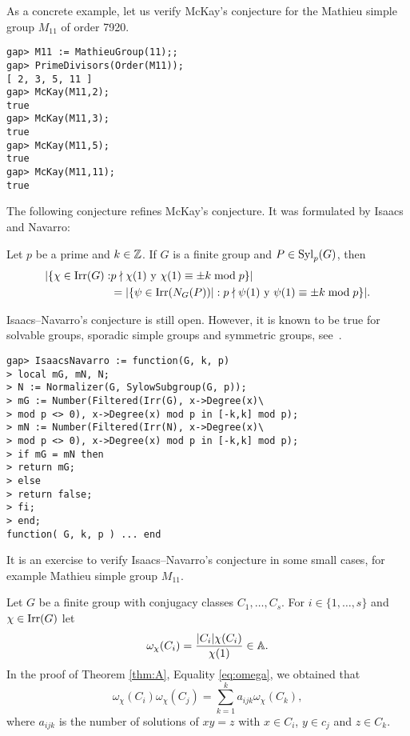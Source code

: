 As a concrete example, let us 
verify McKay's conjecture for the Mathieu simple group 
$M_{11}$ of order 7920. 

\begin{lstlisting}
gap> M11 := MathieuGroup(11);;
gap> PrimeDivisors(Order(M11));
[ 2, 3, 5, 11 ]
gap> McKay(M11,2);
true
gap> McKay(M11,3);
true
gap> McKay(M11,5);
true
gap> McKay(M11,11);
true
\end{lstlisting}

The following conjecture refines McKay's conjecture. It was
formulated by Isaacs and Navarro:

\begin{conjecture}
\label{conjecture:IsaacsNavarro}
Let $p$ be a prime and $k\in\mathbb{Z}$. 
If $G$ is a finite group and $P\in\mathrm{Syl}_p(G)$,
then
\begin{align*}
|\{\chi\in\operatorname{Irr}(G):&p\nmid \chi(1)\text{ y }\chi(1)\equiv\pm k\bmod p\}|\\
&=|\{\psi\in\operatorname{Irr}(N_G(P))|:p\nmid\psi(1)\text{ y }\psi(1)\equiv\pm k\bmod p\}|.
\end{align*}
\end{conjecture}

Isaacs--Navarro's conjecture is still open. However, 
it is known to be true for solvable groups, 
sporadic simple groups and 
symmetric groups, see~\cite{MR1935849}. 

\begin{lstlisting}
gap> IsaacsNavarro := function(G, k, p)
> local mG, mN, N;
> N := Normalizer(G, SylowSubgroup(G, p));
> mG := Number(Filtered(Irr(G), x->Degree(x)\
> mod p <> 0), x->Degree(x) mod p in [-k,k] mod p);
> mN := Number(Filtered(Irr(N), x->Degree(x)\
> mod p <> 0), x->Degree(x) mod p in [-k,k] mod p);
> if mG = mN then
> return mG;
> else
> return false;
> fi;
> end;
function( G, k, p ) ... end
\end{lstlisting}

It is an exercise to verify Isaacs--Navarro's conjecture in some
small cases, for example Mathieu simple group $M_{11}$. 

\label{commutators}

Let $G$ be a finite group with conjugacy classes $C_1,\dots,C_s$. For
$i\in\{1,\dots,s\}$ and $\chi\in\operatorname{Irr}(G)$ let  
\[
\omega_{\chi}(C_i)=\frac{|C_i|\chi(C_i)}{\chi(1)}\in\mathbb{A}.
\]
In the proof of Theorem \ref{thm:A}, Equality \eqref{eq:omega}, 
we obtained
that 
\begin{equation}
\label{eq:again_omega}
\omega_\chi(C_i)\omega_\chi(C_j)=\sum_{k=1}^ka_{ijk}\omega_{\chi}(C_k),
\end{equation}
where $a_{ijk}$ is the number of solutions 
of $xy=z$ with $x\in C_i$, $y\in c_j$ and $z\in C_k$. 

